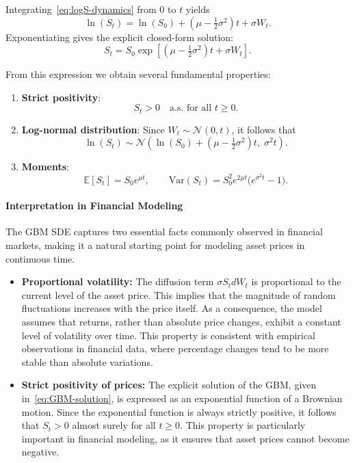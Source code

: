 Integrating~\eqref{eq:logS-dynamics} from $0$ to $t$ yields
\[
\ln(S_t)
= \ln(S_0)
+ \left(\mu - \tfrac{1}{2}\sigma^2\right)t
+ \sigma W_t.
\]
Exponentiating gives the explicit closed-form solution:
\begin{equation}\label{eq:GBM-solution}
S_t
= S_0 \exp\!\left[
     \left(\mu - \tfrac12\sigma^2\right)t
     + \sigma W_t
   \right].
\end{equation}

From this expression we obtain several fundamental properties:

\begin{enumerate}
    \item \textbf{Strict positivity}:
    \[
    S_t > 0 \quad \text{a.s. for all } t \ge 0.
    \]

    \item \textbf{Log-normal distribution}:  
    Since $W_t \sim \mathcal{N}(0,t)$, it follows that
    \[
    \ln(S_t)
    \sim \mathcal{N}\!\left(
        \ln(S_0) + \left(\mu - \tfrac12 \sigma^2\right)t,
        \; \sigma^2 t
    \right).
    \]

    \item \textbf{Moments}:
    \[
    \mathbb{E}[S_t] = S_0 e^{\mu t}, \qquad
    \mathrm{Var}(S_t) = S_0^2 e^{2\mu t} \big( e^{\sigma^2 t} - 1 \big).
    \]
\end{enumerate}


\paragraph{Interpretation in Financial Modeling}

The GBM SDE captures two essential facts commonly observed in financial markets, making it a natural starting point for modeling asset prices in continuous time.

\begin{itemize}
    \item \textbf{Proportional volatility:}  
    The diffusion term $\sigma S_t dW_t$ is proportional to the current level of the asset price. This implies that the magnitude of random fluctuations increases with the price itself. As a consequence, the model assumes that returns, rather than absolute price changes, exhibit a constant level of volatility over time. This property is consistent with empirical observations in financial data, where percentage changes tend to be more stable than absolute variations.

    \item \textbf{Strict positivity of prices:}  
    The explicit solution of the GBM, given in~\eqref{eq:GBM-solution}, is expressed as an exponential function of a Brownian motion. Since the exponential function is always strictly positive, it follows that $S_t > 0$ almost surely for all $t \ge 0$. This property is particularly important in financial modeling, as it ensures that asset prices cannot become negative.
\end{itemize}

